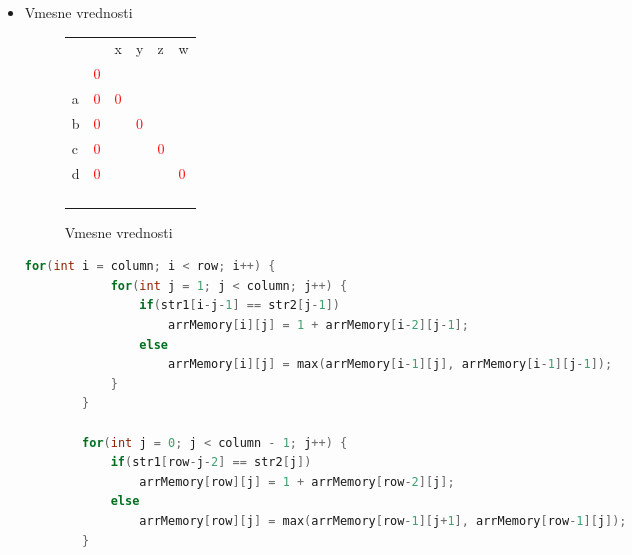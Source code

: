\documentclass[a4paper,12pt,openright]{book}
\begin{document}
\begin{itemize}
    \item Vmesne vrednosti
    
        \begin{figure}[htb]
        \begin{center}
\begin{tabular}{|l|l|l|l|l|l|}
\cline{3-6}
  \multicolumn{2}{c|}{}  & x & y & z & w\\ \cline{2-6}
 \multicolumn{1}{c|}{} & \textcolor{red}{0} & \multicolumn{4}{c}{} \\ \cline{1-3}
a  & \textcolor{red}{0} & \textcolor{red}{0} &  \multicolumn{3}{c}{} \\ \cline{1-4}
b  & \textcolor{red}{0} & \textcolor{blue}{} & \textcolor{red}{0} & \multicolumn{2}{c}{}  \\ \cline{1-5}
c  & \textcolor{red}{0} & \textcolor{purple}{} & \textcolor{blue}{} & \textcolor{red}{0} & \multicolumn{1}{c}{} \\ \cline{1-6}
d  & \textcolor{red}{0} & \textcolor{brown}{} & \textcolor{purple}{} & \textcolor{blue}{} & \textcolor{red}{0} \\ \hline
 \multicolumn{1}{c|}{} & \cellcolor{blue!15} & \cellcolor{blue!15} & \cellcolor{blue!15} & \cellcolor{blue!15} & \multicolumn{1}{c}{}  \\ \cline{2-5}
\multicolumn{1}{c|}{}  &  & \textcolor{brown}{} & \textcolor{purple}{} & \multicolumn{2}{c}{}   \\ \cline{2-4}
\multicolumn{1}{c|}{}  &  & \textcolor{brown}{} &  \multicolumn{3}{c}{}   \\ \cline{2-3}
\multicolumn{1}{c|}{}  &  & \multicolumn{4}{c}{}  \\ \cline{2-2}
\end{tabular}
        \end{center}
        \caption{Vmesne vrednosti}
        \label{diagMemory3}
        \end{figure}
        
        \begin{lstlisting}[language=C++, caption={Izračun vmesnih vrednosti za LCS}, captionpos=b, label=diagonalMemory3]
        for(int i = column; i < row; i++) {
            for(int j = 1; j < column; j++) {
                if(str1[i-j-1] == str2[j-1])
                    arrMemory[i][j] = 1 + arrMemory[i-2][j-1];
                else
                    arrMemory[i][j] = max(arrMemory[i-1][j], arrMemory[i-1][j-1]);
            }
        }
        
        for(int j = 0; j < column - 1; j++) {
            if(str1[row-j-2] == str2[j])
                arrMemory[row][j] = 1 + arrMemory[row-2][j];
            else
                arrMemory[row][j] = max(arrMemory[row-1][j+1], arrMemory[row-1][j]);
        }
        \end{lstlisting}


\end{itemize}
\end{document}
